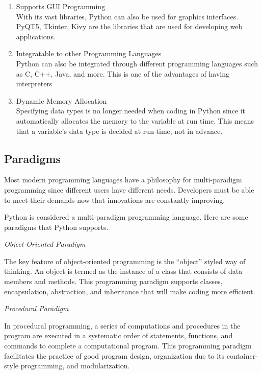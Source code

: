 \documentclass{article}
\begin{document}
\begin{enumerate}
    \item Supports GUI Programming\\
    With its vast libraries, Python can also be used for graphics interfaces. PyQT5, Tkinter, Kivy are the libraries that are used for developing web applications.

    \item Integratable to other Programming Languages\\
    Python can also be integrated through different programming languages such as C, C++, Java, and more. This is one of the advantages of having interpreters

    \item Dynamic Memory Allocation\\
    Specifying data types is no longer needed when coding in Python since it automatically allocates the memory to the variable at run time. This means that a variable’s data type is decided at run-time, not in advance.

\end{enumerate}


\subsection*{Paradigms}
\par
Most modern programming languages have a philosophy for multi-paradigm programming since different users have different needs. Developers must be able to meet their demands now that innovations are constantly improving.
\par
Python is considered a multi-paradigm programming language. Here are some paradigms that Python supports.

\par
\noindent
\textit{Object-Oriented Paradigm}

\par
The key feature of object-oriented programming is the “object” styled way of thinking. An object is termed as the instance of a class that consists of data members and methods. This programming paradigm supports classes, encapsulation, abstraction, and inheritance that will make coding more efficient.

\par
\noindent
\textit{Procedural Paradigm}

\par
In procedural programming, a series of computations and procedures in the program are executed in a systematic order of statements, functions, and commands to complete a computational program. This programming paradigm facilitates the practice of good program design, organization due to its container-style programming, and modularization.
\end{document}
